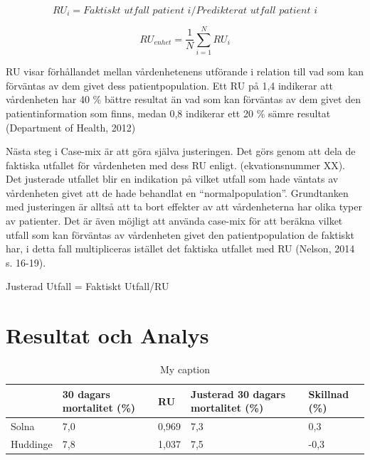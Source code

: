 \begin{equation}
\label{eq:metod1}
	RU_i = Faktiskt \,\,  utfall \,\, patient \,\, i/Predikterat \,\, utfall \,\, patient \,\, i
\end{equation}

\begin{equation}
\label{eq:metod2}
	RU_{enhet} = \frac{1}{N} \sum_{i=1}^{N} RU_i
\end{equation}


RU visar förhållandet mellan vårdenhetenens utförande i relation till vad som kan förväntas av dem givet dess patientpopulation. Ett RU på 1,4 indikerar att vårdenheten har 40 \% bättre resultat än vad som kan förväntas av dem givet den patientinformation som finns, medan 0,8 indikerar ett 20 \% sämre resultat (Department of Health, 2012)

Nästa steg i Case-mix är att göra själva justeringen. Det görs genom att dela de faktiska utfallet för vårdenheten med dess RU enligt. (ekvationsnummer XX). Det justerade utfallet blir en indikation på vilket utfall som hade väntats av vårdenheten givet att de hade behandlat en “normalpopulation”. Grundtanken med justeringen är alltså att ta bort effekter av att vårdenheterna har olika typer av patienter. Det är även möjligt att använda case-mix för att beräkna vilket utfall som kan förväntas av vårdenheten givet den patientpopulation de faktiskt har, i detta fall multipliceras istället det faktiska utfallet med RU (Nelson, 2014 s. 16-19).

Justerad Utfall = Faktiskt Utfall/RU

\section{Resultat och Analys}

\begin{table}[h]
\centering
\caption{My caption}
\label{my-label}
\begin{tabular}{|p{2cm}|p{3cm}|p{1cm}|p{3cm}|p{2cm}|}
\hline
         & 30 dagars mortalitet (\%) & RU    & Justerad 30 dagars mortalitet (\%) & Skillnad (\%) \\ \hline
Solna    & 7,0                      & 0,969 & 7,3                               & 0,3          \\ \hline
Huddinge & 7,8                      & 1,037 & 7,5                               & -0,3         \\ \hline
\end{tabular}
\end{table}

